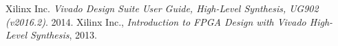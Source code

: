 \documentclass[paper=letter, fontsize=10pt]{scrartcl} %
\numberwithin{equation}{section} %
\numberwithin{figure}{section} %
\numberwithin{table}{section} %
\begin{document}
\begin{thebibliography}{9}

  Xilinx Inc. \emph{Vivado Design Suite User Guide, High-Level Synthesis, UG902 (v2016.2)}. 2014.
  Xilinx Inc., \emph{Introduction to FPGA Design with Vivado High-Level Synthesis}, 2013.

\end{thebibliography}
\end{document}
